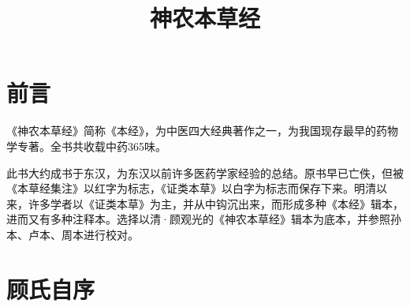 \documentclass[12pt,UTF8]{ctexbook}
\title{\heiti\zihao{0} 神农本草经}
\author{}
\date{}
\begin{document}
	
\maketitle
\tableofcontents
	
\frontmatter

\chapter{前言}

《神农本草经》简称《本经》，为中医四大经典著作之一，为我国现存最早的药物学专著。全书共收载中药365味。

此书大约成书于东汉，为东汉以前许多医药学家经验的总结。原书早已亡佚，但被《本草经集注》以红字为标志，《证类本草》以白字为标志而保存下来。明清以来，许多学者以《证类本草》为主，并从中钩沉出来，而形成多种《本经》辑本，进而又有多种注释本。选择以清·顾观光的《神农本草经》辑本为底本，并参照孙本、卢本、周本进行校对。

\chapter{顾氏自序}
\end{document}
